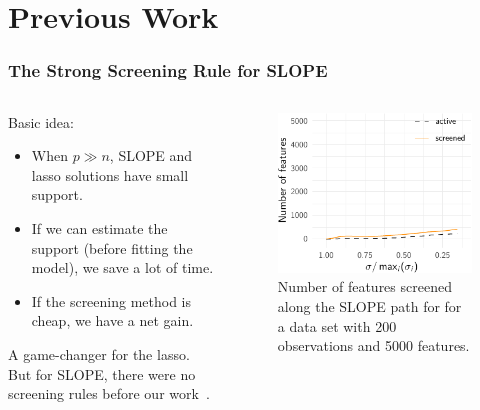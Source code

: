 \documentclass[10pt,aspectratio=169]{beamer}
\begin{document}
%

\section{Previous Work}

\begin{frame}[c]
  \frametitle{The Strong Screening Rule for SLOPE}

  \begin{columns}
    \begin{column}{0.45\textwidth}
      Basic idea:
      \begin{itemize}
        \item When \(p \gg n\), SLOPE and lasso solutions have small support.
        \item If we can estimate the support (before fitting the model), we save a lot of time.
        \item If the screening method is cheap, we have a net gain.
      \end{itemize}
      \pause
      A game-changer for the lasso. But for SLOPE, there were no screening rules before our work~\parencite{larsson2020b}.
    \end{column}
    \pause
    \begin{column}{0.45\textwidth}
      \begin{figure}
        \centering
        \includegraphics{figures/strong-efficiency-gaussian.pdf}
        \caption{%
          Number of features screened along the SLOPE path for for a data set with 200 observations and 5000 features.
        }
      \end{figure}
    \end{column}
  \end{columns}
\end{frame}
\end{document}
